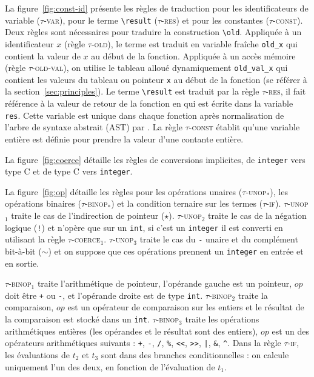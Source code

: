 La figure~\ref{fig:const-id} présente les règles de traduction pour les
identificateurs de variable (\textsc{$\tau$-var}), pour le terme
\lstinline|\result| (\textsc{$\tau$-res}) et pour les constantes
(\textsc{$\tau$-const}).
Deux règles sont nécessaires pour traduire la construction \eacsl
\lstinline|\old|.
Appliquée à un identificateur $x$ (règle \textsc{$\tau$-old}), le terme est
traduit en variable fraîche \lstinline|old_x| qui contient la valeur de $x$ au
début de la fonction.
Appliquée à un accès mémoire (règle \textsc{$\tau$-old-val}), on utilise le
tableau alloué dynamiquement \lstinline|old_val_x| qui contient les valeurs du
tableau ou pointeur \lstinline'x' au début de la fonction (se référer à la
section~\ref{sec:principles}).
Le terme \lstinline|\result| est traduit par la règle \textsc{$\tau$-res}, il
fait référence à la valeur de retour de la fonction en \eacsl qui est écrite
dans la variable \lstinline|res|.
Cette variable est unique dans chaque fonction après normalisation de l'arbre de
syntaxe abstrait (AST) par \framac.
La règle \textsc{$\tau$-const} établit qu'une variable entière est définie pour
prendre la valeur d'une contante entière.

La figure~\ref{fig:coerce} détaille les règles de conversions implicites, de
\lstinline'integer' vers type C et de type C vers \lstinline'integer'.

La figure~\ref{fig:op} détaille les règles pour les opérations unaires
(\textsc{$\tau$-unop$_{*}$}), les opérations binaires
(\textsc{$\tau$-binop$_{*}$}) et la condition ternaire sur les termes
(\textsc{$\tau$-if}).
\textsc{$\tau$-unop$_1$} traite le cas de l'indirection de pointeur ($\star$).
\textsc{$\tau$-unop$_2$} traite le cas de la négation logique (\lstinline|!|) et
n'opère que sur un \lstinline'int', si c'est un \lstinline'integer' il est
converti en utilisant la règle \textsc{$\tau$-coerce$_1$}.
\textsc{$\tau$-unop$_3$} traite le cas du \lstinline|-| unaire et du complément
bit-à-bit ($\sim$) et on suppose que ces opérations prennent un
\lstinline'integer' en entrée et en sortie.

\textsc{$\tau$-binop$_1$} traite l'arithmétique de pointeur, l'opérande gauche
est un pointeur, $op$ doit être \lstinline|+| ou \lstinline|-|, et l'opérande
droite est de type \lstinline'int'.
\textsc{$\tau$-binop$_2$} traite la comparaison, $op$ est un opérateur de
comparaison sur les entiers et le résultat de la comparaison est stocké dans un
\lstinline|int|.
\textsc{$\tau$-binop$_3$} traite les opérations arithmétiques entières (les
opérandes et le résultat sont des entiers), $op$ est un des opérateurs
arithmétiques suivants : \lstinline|+|, \lstinline|-|, \lstinline|/|,
\lstinline|%|, \lstinline|<<|, \lstinline|>>|, \lstinline{|}, \lstinline|&|,
\lstinline|^|.
Dans la règle \textsc{$\tau$-if}, les évaluations de $t_2$ et $t_3$ sont dans
des branches conditionnelles : on calcule uniquement l'un des deux, en fonction
de l'évaluation de $t_1$.

